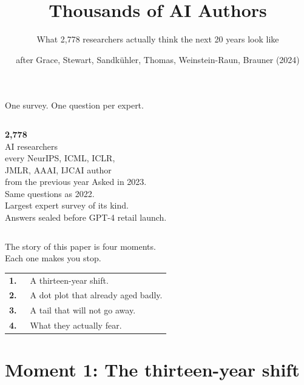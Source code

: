 \documentclass[aspectratio=169, 12pt, xcolor={dvipsnames,table}]{beamer}
\title{Thousands of AI Authors}
\subtitle{What 2,778 researchers actually think the next 20 years look like}
\author{\small after Grace, Stewart, Sandk\"uhler, Thomas, Weinstein-Raun, Brauner (2024)}
\date{}
\newcommand{\bignum}[1]{{\fontsize{60}{66}\selectfont\bfseries\color{accent}#1}}
\begin{document}
\begin{frame}[plain]
  \titlepage
\end{frame}

\begin{frame}{One survey. One question per expert.}
  \vfill
  \begin{columns}[T]
    \bignum{2{,}778}\\[0.4em]
    {\large AI researchers}\\
    {\small every NeurIPS, ICML, ICLR,\\JMLR, AAAI, IJCAI author\\from the previous year}
    \vspace{1.5em}
    {\large Asked in 2023.}\\[0.3em]
    {\large Same questions as 2022.}\\[1em]
    {\color{mute}Largest expert survey of its kind.\\Answers sealed before GPT-4 retail launch.}
  \end{columns}
  \vfill
\end{frame}

\begin{frame}[plain]
  \centering\vfill
  {\color{mute}\large The story of this paper is four moments.}\\[2em]
  {\large Each one makes you stop.}\\[2em]
  \begin{tabular}{rl}
    \color{accent}\bfseries 1.~ & A thirteen-year shift.\\[0.3em]
    \color{accent}\bfseries 2.~ & A dot plot that already aged badly.\\[0.3em]
    \color{accent}\bfseries 3.~ & A tail that will not go away.\\[0.3em]
    \color{accent}\bfseries 4.~ & What they actually fear.\\
  \end{tabular}
  \vfill
\end{frame}

\section{Moment 1: The thirteen-year shift}
\end{document}
